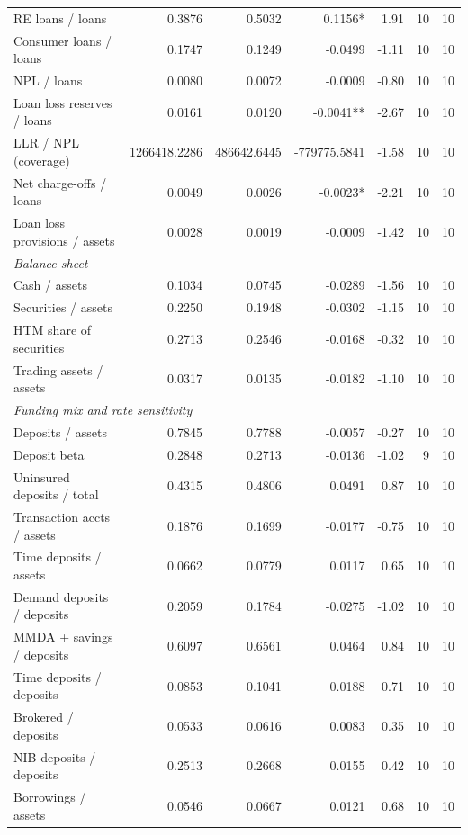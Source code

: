 \begin{tabular}{lrrrrrr}
RE loans / loans & 0.3876 & 0.5032 & 0.1156* & 1.91 & 10 & 10 \\
Consumer loans / loans & 0.1747 & 0.1249 & -0.0499 & -1.11 & 10 & 10 \\
NPL / loans & 0.0080 & 0.0072 & -0.0009 & -0.80 & 10 & 10 \\
Loan loss reserves / loans & 0.0161 & 0.0120 & -0.0041** & -2.67 & 10 & 10 \\
LLR / NPL (coverage) & 1266418.2286 & 486642.6445 & -779775.5841 & -1.58 & 10 & 10 \\
Net charge-offs / loans & 0.0049 & 0.0026 & -0.0023* & -2.21 & 10 & 10 \\
Loan loss provisions / assets & 0.0028 & 0.0019 & -0.0009 & -1.42 & 10 & 10 \\
\midrule
\multicolumn{7}{l}{\emph{Balance sheet}} \\
\midrule
Cash / assets & 0.1034 & 0.0745 & -0.0289 & -1.56 & 10 & 10 \\
Securities / assets & 0.2250 & 0.1948 & -0.0302 & -1.15 & 10 & 10 \\
HTM share of securities & 0.2713 & 0.2546 & -0.0168 & -0.32 & 10 & 10 \\
Trading assets / assets & 0.0317 & 0.0135 & -0.0182 & -1.10 & 10 & 10 \\
\midrule
\multicolumn{7}{l}{\emph{Funding mix and rate sensitivity}} \\
\midrule
Deposits / assets & 0.7845 & 0.7788 & -0.0057 & -0.27 & 10 & 10 \\
Deposit beta & 0.2848 & 0.2713 & -0.0136 & -1.02 & 9 & 10 \\
Uninsured deposits / total & 0.4315 & 0.4806 & 0.0491 & 0.87 & 10 & 10 \\
Transaction accts / assets & 0.1876 & 0.1699 & -0.0177 & -0.75 & 10 & 10 \\
Time deposits / assets & 0.0662 & 0.0779 & 0.0117 & 0.65 & 10 & 10 \\
Demand deposits / deposits & 0.2059 & 0.1784 & -0.0275 & -1.02 & 10 & 10 \\
MMDA + savings / deposits & 0.6097 & 0.6561 & 0.0464 & 0.84 & 10 & 10 \\
Time deposits / deposits & 0.0853 & 0.1041 & 0.0188 & 0.71 & 10 & 10 \\
Brokered / deposits & 0.0533 & 0.0616 & 0.0083 & 0.35 & 10 & 10 \\
NIB deposits / deposits & 0.2513 & 0.2668 & 0.0155 & 0.42 & 10 & 10 \\
Borrowings / assets & 0.0546 & 0.0667 & 0.0121 & 0.68 & 10 & 10 \\

\end{tabular}
